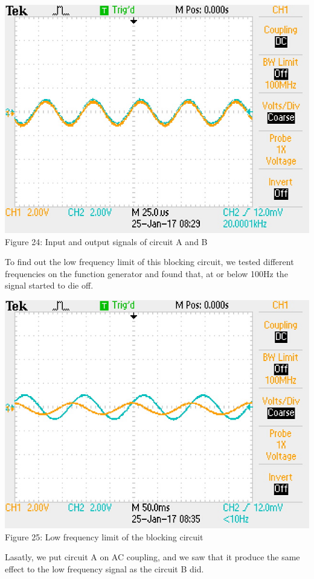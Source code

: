 \documentclass[]{article}
\begin{document}
\begin{center}
	\includegraphics[scale=0.7]{i_ABsignal}\\
	Figure 24: Input and output signals of circuit A and B
\end{center}
To find out the low frequency limit of this blocking circuit, we tested different frequencies on the function generator and found that, at or below 100Hz the signal started to die off. 
\begin{center}
	\includegraphics[scale=0.7]{i_lowfreq}\\
	Figure 25: Low frequency limit of the blocking circuit
\end{center}
Lasatly, we put circuit A on AC coupling, and we saw that it produce the same effect to the low frequency signal  as the circuit B did.
\end{document}
